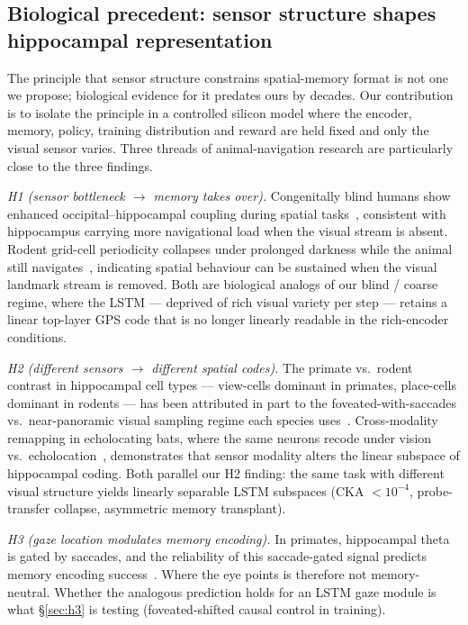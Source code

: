 \documentclass{article}
\begin{document}
\subsection{Biological precedent: sensor structure shapes hippocampal representation}
\label{sec:bio}

The principle that sensor structure constrains spatial-memory format is not one we propose; biological evidence for it predates ours by decades. Our contribution is to isolate the principle in a controlled silicon model where the encoder, memory, policy, training distribution and reward are held fixed and only the visual sensor varies. Three threads of animal-navigation research are particularly close to the three findings.

\emph{H1 (sensor bottleneck $\to$ memory takes over).} Congenitally blind humans show enhanced occipital--hippocampal coupling during spatial tasks~\citep{kupers2014blind}, consistent with hippocampus carrying more navigational load when the visual stream is absent. Rodent grid-cell periodicity collapses under prolonged darkness while the animal still navigates~\citep{chen2016grid}, indicating spatial behaviour can be sustained when the visual landmark stream is removed. Both are biological analogs of our blind / coarse regime, where the LSTM --- deprived of rich visual variety per step --- retains a linear top-layer GPS code that is no longer linearly readable in the rich-encoder conditions.

\emph{H2 (different sensors $\to$ different spatial codes).} The primate vs.\ rodent contrast in hippocampal cell types --- view-cells dominant in primates, place-cells dominant in rodents --- has been attributed in part to the foveated-with-saccades vs.\ near-panoramic visual sampling regime each species uses~\citep{rolls2024why}. Cross-modality remapping in echolocating bats, where the same neurons recode under vision vs.\ echolocation~\citep{geva2016remapping}, demonstrates that sensor modality alters the linear subspace of hippocampal coding. Both parallel our H2 finding: the same task with different visual structure yields linearly separable LSTM subspaces (CKA $<10^{-4}$, probe-transfer collapse, asymmetric memory transplant).

\emph{H3 (gaze location modulates memory encoding).} In primates, hippocampal theta is gated by saccades, and the reliability of this saccade-gated signal predicts memory encoding success~\citep{jutras2013saccades,tas2016overt}. Where the eye points is therefore not memory-neutral. Whether the analogous prediction holds for an LSTM gaze module is what §\ref{sec:h3} is testing (foveated-shifted causal control in training).
\end{document}
